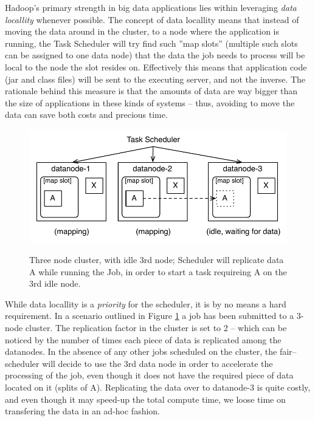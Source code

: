 Hadoop's primary strength in big data applications lies within leveraging \textit{data locallity} whenever possible. The concept of data locallity means that instead of moving the data around in the cluster, to a node where the application is running, the Task Scheduler will try find such ''map slots'' (multiple such slots can be assigned to one data node) that the data the job needs to process will be local to the node the slot resides on. Effectively this means that application code (jar and class files) will be sent to the executing server, and not the inverse. The rationale behind this measure is that the amounts of data are way bigger than the size of applications in these kinds of systems -- thus, avoiding to move the data can save both costs and precious time.


\begin{figure}[ch!]
  \centering
  \includegraphics[width=\textwidth]{img/forced-data-replication.pdf}
  \label{fig:replication-ad-hoc}
  \caption{Three node cluster, with idle 3rd node; Scheduler will replicate data A while running the Job, in order to start a task requireing A on the 3rd idle node.}
\end{figure}


While data locallity is a \textit{priority} for the scheduler, it is by no means a hard requirement. In a scenario outlined in Figure \ref{fig:replication-ad-hoc} a job has been submitted to a 3-node cluster. The replication factor in the cluster is set to 2 -- which can be noticed by the number of times each piece of data is replicated among the datanodes. In the absence of any other jobs scheduled on the cluster, the fair--scheduler will decide to use the 3rd data node in order to accelerate the processing of the job, even though it does not have the required piece of data located on it (splits of A). Replicating the data over to datanode-3 is quite costly, and even though it may speed-up the total compute time, we loose time on transfering the data in an ad-hoc fashion.

